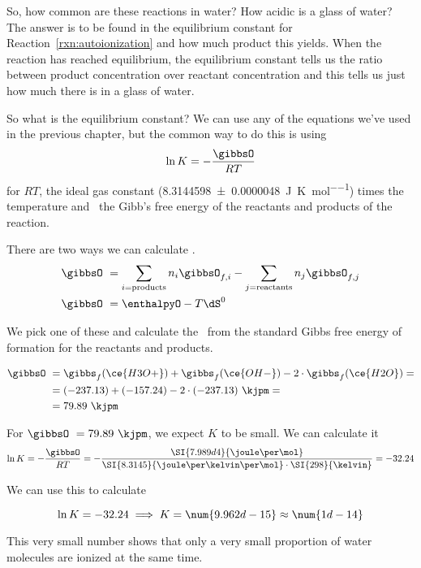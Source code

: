 \documentclass[../mit-general-chemistry.tex]{subfiles}
\begin{document}
So, how common are these reactions in water? How acidic is a glass of
water? The answer is to be found in the equilibrium constant for
Reaction~\ref{rxn:autoionization} and how much product this
yields. When the reaction has reached equilibrium, the equilibrium
constant tells us the ratio between product concentration over
reactant concentration and this tells us just how much  there
is in a glass of water.

So what is the equilibrium constant? We can use any of the equations
we've used in the previous chapter, but the common way to do this is
using
\begin{equation*}
  \ln K = - \frac{\gibbsO}{RT}
\end{equation*}
for $RT$, the ideal gas constant
(\SI{8.3144598(48)}{\joule\per\kelvin\per\mol}) times the temperature
and \gibbsO\ the Gibb's free energy of the reactants and products of
the reaction.

There are two ways we can calculate \gibbsO.
\begin{align*}
  &\gibbsO\ = \sum_{i = \text{products}} n_i \gibbsO_{f,i}
  - \sum_{j = \text{reactants}} n_j \gibbsO_{f,j} \\
  &\gibbsO\ = \enthalpyO - T\dS^0
\end{align*}

We pick one of these and calculate the \gibbsO\ from the standard Gibbs
free energy of formation for the reactants and products.

\begin{align*}
  \gibbsO\ &= \gibbs_f(\ce{H3O+}) + \gibbs_f(\ce{OH-}) - 2\cdot\gibbs_f(\ce{H2O}) = \\
  &= (-237.13) + (-157.24) - 2\cdot(-237.13)~\kjpm = \\
  &= 79.89~\kjpm
\end{align*}

For $\gibbsO\ = 79.89~\kjpm$, we expect $K$ to be small. We can
calculate it
\begin{equation*}
  \ln K = -\frac{\gibbsO}{RT}
  = -
  \frac{\SI{7.989d4}{\joule\per\mol}}{\SI{8.3145}{\joule\per\kelvin\per\mol}\cdot\SI{298}{\kelvin}}
  = -32.24
\end{equation*}

We can use this to calculate

\begin{equation*}
  \ln K = -32.24 \implies K = \num{9.962d-15} \approx \num{1d-14}
\end{equation*}

This very small number shows that only a very small proportion of
water molecules are ionized at the same time.
\end{document}
